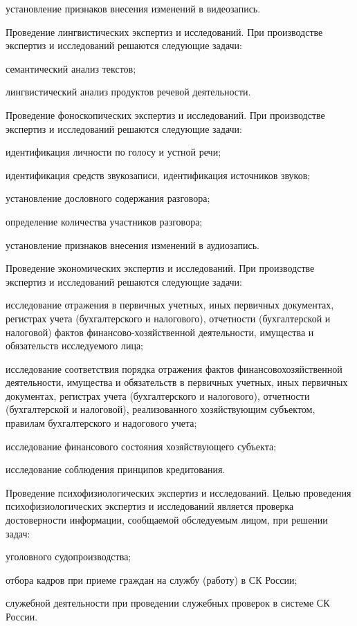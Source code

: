 \begin{enumerate*}
\begin{itemize*}
		\item установление признаков внесения изменений в видеозапись.
	\end{itemize*}
	\item Проведение	лингвистических	экспертиз	и	исследований.	При
производстве экспертиз и исследований решаются следующие задачи:
	\begin{itemize*}
		\item семантический анализ текстов;
		\item лингвистический анализ продуктов речевой деятельности.
	\end{itemize*}
	\item Проведение	фоноскопических	экспертиз	и	исследований.	При
производстве экспертиз и исследований решаются следующие задачи:
	\begin{itemize*}
		\item идентификация личности по голосу и устной речи;
		\item идентификация средств звукозаписи, идентификация источников звуков;
		\item установление дословного содержания разговора;
		\item определение количества участников разговора;
		\item установление признаков внесения изменений в аудиозапись.
	\end{itemize*}
	\item Проведение экономических экспертиз и исследований. При производстве экспертиз и исследований решаются следующие задачи:
	\begin{itemize*}
		\item исследование отражения в первичных учетных, иных первичных документах, регистрах учета (бухгалтерского и налогового), отчетности (бухгалтерской и налоговой) фактов финансово-хозяйственной деятельности, имущества и обязательств исследуемого лица;
		\item исследование соответствия порядка отражения фактов финансовохозяйственной деятельности, имущества и обязательств в первичных учетных, иных первичных документах, регистрах учета (бухгалтерского и налогового), отчетности (бухгалтерской и налоговой), реализованного хозяйствующим субъектом, правилам бухгалтерского и надогового учета;
		\item исследование финансового состояния хозяйствующего субъекта;
		\item исследование соблюдения принципов кредитования.
	\end{itemize*}
	\item Проведение психофизиологических экспертиз и исследований. Целью проведения психофизиологических экспертиз и исследований является проверка достоверности информации, сообщаемой обследуемым лицом, при решении задач:
	\begin{itemize*}
		\item уголовного судопроизводства;
		\item отбора кадров при приеме граждан на службу (работу) в СК России;
		\item служебной деятельности при проведении служебных проверок в системе СК России.
	\end{itemize*}
\end{enumerate*}


